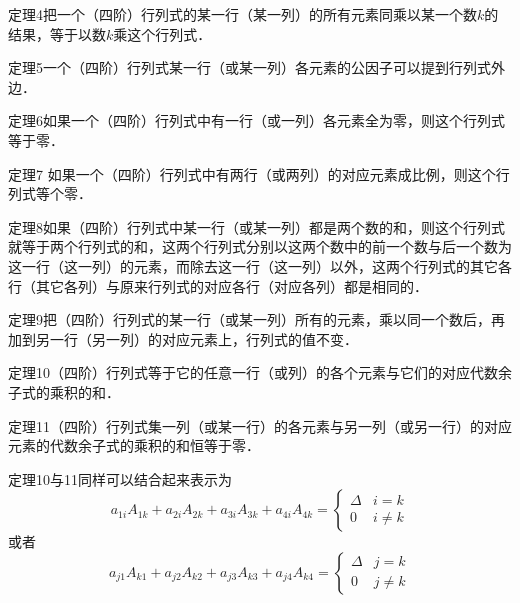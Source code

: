 \begin{blk}
    {定理4}把一个（四阶）行列式的某一行（某一列）的所有元素同乘以某一个数$k$的结果，等于以数$k$乘这个行列式．
\end{blk}

\begin{blk}
    {定理5}一个（四阶）行列式某一行（或某一列）各元素的公因子可以提到行列式外边．
\end{blk}

\begin{blk}
    {定理6}如果一个（四阶）行列式中有一行（或一列）各元素全为零，则这个行列式等于零．
\end{blk}

\begin{blk}
    {定理7} 如果一个（四阶）行列式中有两行（或两列）的对应元素成比例，则这个行列式等个零．
\end{blk}

\begin{blk}
    {定理8}如果（四阶）行列式中某一行（或某一列）都是两个数的和，则这个行列式就等于两个行列式的和，这两个行列式分别以这两个数中的前一个数与后一个数为这一行（这一列）的元素，而除去这一行（这一列）以外，这两个行列式的其它各行（其它各列）与原来行列式的对应各行（对应各列）都是相同的．
\end{blk}

\begin{blk}
    {定理9}把（四阶）行列式的某一行（或某一列）所有的元素，乘以同一个数后，再加到另一行（另一列）的对应元素上，行列式的值不变．
\end{blk}

\begin{blk}
    {定理10}（四阶）行列式等于它的任意一行（或列）的各个元素与它们的对应代数余子式的乘积的和．
\end{blk}

\begin{blk}
    {定理11}（四阶）行列式集一列（或某一行）的各元素与另一列（或另一行）的对应元素的代数余子式的乘积的和恒等于零．
\end{blk}

定理10与11同样可以结合起来表示为
\[a_{1i}A_{1k}+a_{2i}A_{2k}+a_{3i}A_{3k}+a_{4i}A_{4k}=\begin{cases}
    \Delta&i=k \\ 0& i\ne k
\end{cases}\]
或者
\[a_{j1}A_{k1}+a_{j2}A_{k2}+a_{j3}A_{k3}+a_{j4}A_{k4}=\begin{cases}
    \Delta&j=k \\ 0& j\ne k
\end{cases}\]

